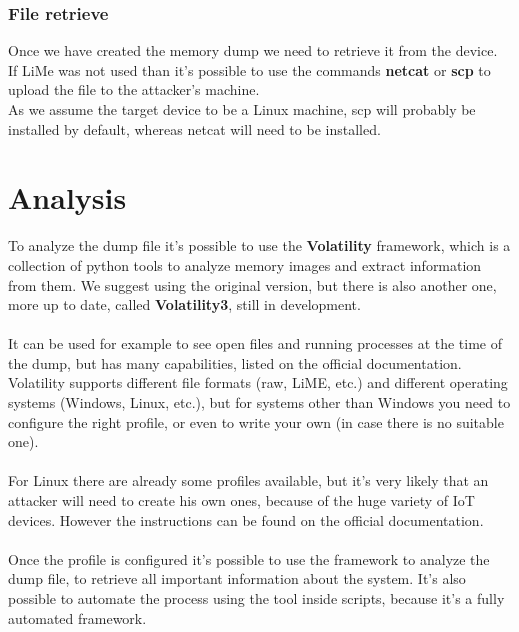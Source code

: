 \subsubsection{File retrieve}
Once we have created the memory dump we need to retrieve it from the device.\\
If LiMe was not used than it's possible to use the commands \textbf{netcat}\cite{netcat} or \textbf{scp}\cite{scp}
to upload the file to the attacker's machine.\\
As we assume the target device to be a Linux machine, scp will probably be installed
by default, whereas netcat will need to be installed.

\section{Analysis}
To analyze the dump file it's possible to use the \textbf{Volatility}\cite{volatility} framework, which is a collection
of python tools to analyze memory images and extract information from them.
We suggest using the original version, but there is also another one, more up to date, called \textbf{Volatility3}\cite{volatility3},
still in development.\\\\
It can be used for example to see open files and running processes at the time of the dump, but
has many capabilities, listed on the official documentation. Volatility supports
different file formats (raw, LiME, etc.) and different operating systems (Windows, Linux, etc.),
but for systems other than Windows you need to configure the right profile,
or even to write your own (in case there is no suitable one).\\\\
For Linux there are already some profiles available, but it's very likely that
an attacker will need to create his own ones, because of the huge variety of 
IoT devices. However the instructions can be found on the official documentation\cite{volatility-conf}.\\\\
Once the profile is configured it's possible to use the framework to analyze the dump file, to
retrieve all important information about the system. It's also possible to 
automate the process using the tool inside scripts, because it's a fully automated
framework.\\\\